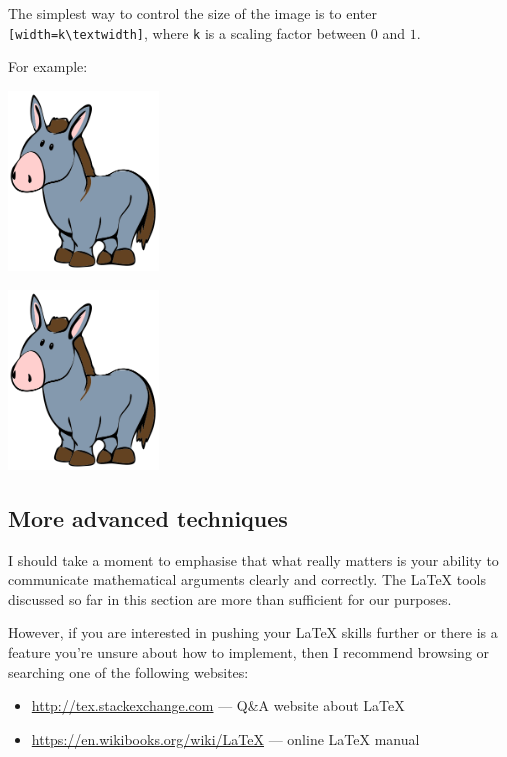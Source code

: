 The simplest way to control the size of the image is to enter \lstinline|[width=k\textwidth]|, where \lstinline|k| is a scaling factor between $0$ and $1$.

For example:

\begin{texcodeleft}[1]
\begin{center}
\includegraphics[width=0.3\textwidth]{media/donkey.png}
\end{center}
\end{texcodeleft}

\begin{texcoderight}[1]
\begin{center}
\includegraphics[width=0.3\textwidth]{book/media/donkey.png}
\end{center}
\end{texcoderight}

\subsection*{More advanced techniques}
I should take a moment to emphasise that what really matters is your ability to communicate mathematical arguments clearly and correctly. The \LaTeX{} tools discussed so far in this section are more than sufficient for our purposes.

However, if you are interested in pushing your \LaTeX{} skills further or there is a feature you're unsure about how to implement, then I recommend browsing or searching one of the following websites:
\begin{itemize}
\item \url{http://tex.stackexchange.com} --- Q\&A website about \LaTeX{}
\item \url{https://en.wikibooks.org/wiki/LaTeX} --- online \LaTeX{} manual
\end{itemize}

